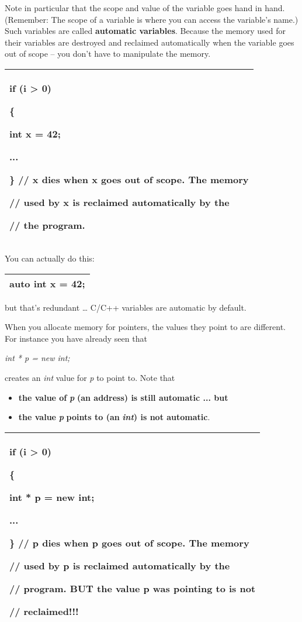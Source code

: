\documentclass[
]{article}
\providecommand{\tightlist}{%
  \setlength{\itemsep}{0pt}\setlength{\parskip}{0pt}}
\begin{document}
Note in particular that the scope and value of the variable goes hand in
hand. (Remember: The scope of a variable is where you can access the
variable's name.) Such variables are called \textbf{automatic
variables}. Because the memory used for their variables are destroyed
and reclaimed automatically when the variable goes out of scope -- you
don't have to manipulate the memory.

\begin{longtable}[]{@{}l@{}}
\toprule
\endhead
\begin{minipage}[t]{0.97\columnwidth}\raggedright
if (i \textgreater{} 0)

\{

int x = 42;

...

\} // x dies when x goes out of scope. The memory

// used by x is reclaimed automatically by the

// the program.\strut
\end{minipage}\tabularnewline
\bottomrule
\end{longtable}

You can actually do this:

\begin{longtable}[]{@{}l@{}}
\toprule
\endhead
auto int x = 42;\tabularnewline
\bottomrule
\end{longtable}

but that's redundant \ldots{} C/C++ variables are automatic by default.

When you allocate memory for pointers, the values they point to are
different. For instance you have already seen that

\emph{int * p = new int;}

creates an \emph{int} value for \emph{p} to point to. Note that

\begin{itemize}
\tightlist
\item
  \textbf{the value of }\emph{\textbf{p}}\textbf{ (an address) is still
  automatic ... but }
\item
  \textbf{the value }\emph{\textbf{p}}\textbf{ points to (an
  }\emph{\textbf{int}}\textbf{) is not automatic}.
\end{itemize}

\begin{longtable}[]{@{}l@{}}
\toprule
\endhead
\begin{minipage}[t]{0.97\columnwidth}\raggedright
if (i \textgreater{} 0)

\{

int * p = new int;

...

\} // p dies when p goes out of scope. The memory

// used by p is reclaimed automatically by the

// program. BUT the value p was pointing to is not

// reclaimed!!! \strut
\end{minipage}\tabularnewline
\bottomrule
\end{longtable}
\end{document}
